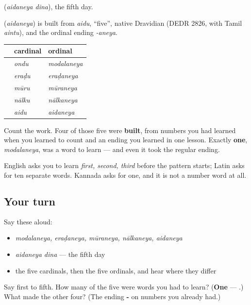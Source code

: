 \textbf{ } (\emph{aidaneya dina}), the fifth day.

\begin{cousinweb}
\textbf{} (\emph{aidaneya}) is built from \emph{aidu}, \textquotedblleft{}five\textquotedblright{}, native Dravidian (DEDR 2826, with Tamil \emph{aintu}), and the ordinal ending \emph{-aneya}.
\end{cousinweb}

\begin{grammarlens}[title={What you've built}]
\noindent
\begin{tabularx}{\linewidth}{@{}>{\raggedright\arraybackslash}X>{\raggedright\arraybackslash}X>{\raggedright\arraybackslash}X@{}}
\toprule
\textbf{} & \textbf{cardinal} & \textbf{ordinal} \\
\midrule
1 & \kn{ಒಂದು} \emph{ondu} & \textbf{\kn{ಮೊದಲನೆಯ}} \emph{modalaneya} \\
2 & \kn{ಎರಡು} \emph{eraḍu} & \textbf{\kn{ಎರಡನೆಯ}} \emph{eraḍaneya} \\
3 & \kn{ಮೂರು} \emph{mūru} & \textbf{\kn{ಮೂರನೆಯ}} \emph{mūraneya} \\
4 & \kn{ನಾಲ್ಕು} \emph{nālku} & \textbf{\kn{ನಾಲ್ಕನೆಯ}} \emph{nālkaneya} \\
5 & \kn{ಐದು} \emph{aidu} & \textbf{\kn{ಐದನೆಯ}} \emph{aidaneya} \\
\bottomrule
\end{tabularx}

Count the work. Four of those five were \textbf{built}, from numbers you had learned when you learned to count and an ending you learned in one lesson. Exactly \textbf{one}, \emph{modalaneya}, was a word to learn — and even it took the regular ending.

English asks you to learn \emph{first, second, third} before the pattern starts; Latin asks for ten separate words. Kannada asks for one, and it is not a number word at all.
\end{grammarlens}

\subsection*{Your turn}
Say these aloud:

\begin{itemize}
\raggedright
  \item \emph{modalaneya, eraḍaneya, mūraneya, nālkaneya, aidaneya}
  \item \emph{aidaneya dina} — the fifth day
  \item the five cardinals, then the five ordinals, and hear where they differ
\end{itemize}

\begin{tcolorbox}[breakable,colback=teal!4,colframe=teal!35!black,title={Before you move on}]
Say first to fifth. How many of the five were words you had to learn? (\textbf{One} — .) What made the other four? (The ending \textbf{-} on numbers you already had.)
\end{tcolorbox}
